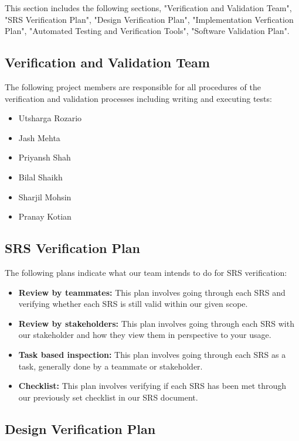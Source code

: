 \documentclass[12pt, titlepage]{article}
\begin{document}
This section includes the following sections, "Verification and Validation Team", "SRS Verification Plan", "Design Verification Plan", "Implementation Verfication Plan", "Automated Testing and Verification Tools", "Software Validation Plan".

\subsection{Verification and Validation Team}

The following project members are responsible for all procedures of the verification and validation processes including writing and executing tests:
\begin{itemize}
    \item Utsharga Rozario
    \item Jash Mehta
    \item Priyansh Shah
    \item Bilal Shaikh
    \item Sharjil Mohsin
    \item Pranay Kotian
\end{itemize}

\subsection{SRS Verification Plan}

The following plans indicate what our team intends to do for SRS verification:
\begin{itemize}
    \item \textbf{Review by teammates:} This plan involves going through each SRS and verifying whether each SRS is still valid within our given scope.
    \item \textbf{Review by stakeholders:} This plan involves going through each SRS with our stakeholder and how they view them in perspective to your usage.
    \item \textbf{Task based inspection:} This plan involves going through each SRS as a task, generally done by a teammate or stakeholder.
    \item \textbf{Checklist:} This plan involves verifying if each SRS has been met through our previously set checklist in our SRS document.
\end{itemize}

\subsection{Design Verification Plan}
\end{document}
